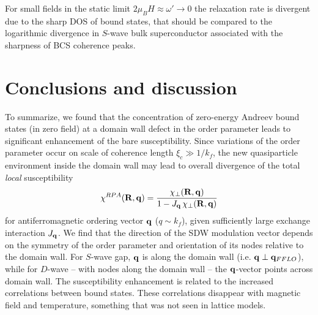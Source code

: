 \documentclass[prb,aps,showpacs,amsmath,twocolumn,10pt]{revtex4-1}
\begin{document}
For small fields in the static limit $2\mu_B H \approx \omega' \to 0$ the 
relaxation rate is divergent due to the sharp DOS of bound states, 
that should be compared to the 
logarithmic divergence in $S$-wave bulk superconductor associated with 
the sharpness of BCS coherence peaks.\cite{tinkham}

\section{Conclusions and discussion}
\label{sec:concl}
%

To summarize, we found that the concentration of zero-energy Andreev bound states (in zero field) at a domain wall 
defect in the order parameter leads to significant enhancement of the bare 
susceptibility. Since variations of the order parameter occur on scale of coherence length $\xi_c \gg 1/k_f$, 
the new quasiparticle environment inside the domain wall may lead to overall divergence of the total 
\emph{local} susceptibility
$$
\chi^{RPA}({\bf R},{\bf q}) = \frac{ \chi_\perp({\bf R},{\bf q})}{1 - J_{\bf q} \, \chi_\perp({\bf R},{\bf q}) }
$$
for antiferromagnetic ordering vector ${\bf q}$ ($q \sim k_f$), given sufficiently 
large exchange interaction $J_{\bf q}$. 
We find that the direction of the SDW modulation vector depends on the symmetry of 
the order parameter and orientation of its nodes relative to the domain wall. 
For $S$-wave gap, ${\bf q}$ is along the domain wall (i.e. ${\bf q} \perp {\bf q}_{FFLO}$), 
while for $D$-wave -- with nodes along the domain wall -- the ${\bf q}$-vector points across domain wall. 
The susceptibility enhancement is related to the increased correlations between 
bound states. 
These correlations disappear with magnetic field and temperature, something that was not seen in lattice models. 
\end{document}
